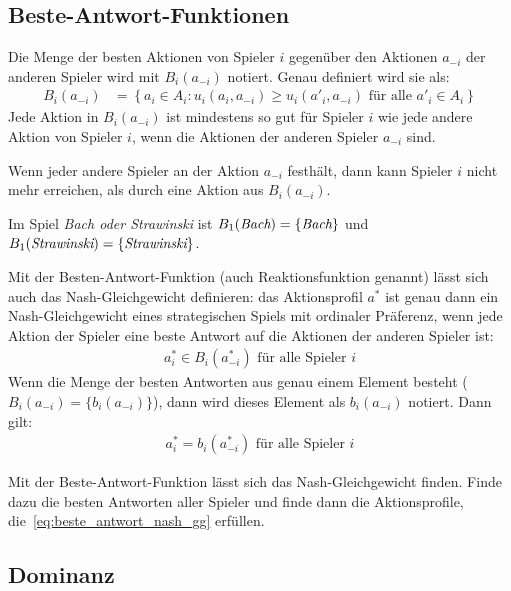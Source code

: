 \subsection{Beste-Antwort-Funktionen}%
\label{sub:beste_antwort_funktionen}

\begin{definition}
  Die Menge der besten Aktionen von Spieler $i$ gegenüber den Aktionen $a_{-i}$ der
  anderen Spieler wird mit $B_i(a_{-i})$ notiert.
  Genau definiert wird sie als:
  \begin{align*}
    B_i(a_{-i}) & = \left\{
      a_i \in A_i :
      u_i(a_i, a_{-i}) \geq u_i(a'_i, a_{-i})
      \text{ für alle $a'_i \in A_i$}
    \right\}
  \end{align*}
  Jede Aktion in $B_i(a_{-i})$ ist mindestens so gut für Spieler $i$ wie jede andere
  Aktion von Spieler $i$, wenn die Aktionen der anderen Spieler $a_{-i}$ sind.

  Wenn jeder andere Spieler an der Aktion $a_{-i}$ festhält, dann kann Spieler $i$ nicht
  mehr erreichen, als durch eine Aktion aus $B_i(a_{-i})$.
\end{definition}

Im Spiel \emph{Bach oder Strawinski} ist
$B_1(\emph{Bach}) = \{ \emph{Bach} \}$ und
$B_1(\emph{Strawinski}) = \{ \emph{Strawinski} \}$.

Mit der Besten-Antwort-Funktion (auch Reaktionsfunktion genannt) lässt sich auch das
Nash-Gleichgewicht definieren:
das Aktionsprofil $a^*$ ist genau dann ein Nash-Gleichgewicht eines strategischen Spiels
mit ordinaler Präferenz, wenn jede Aktion der Spieler eine beste Antwort auf die Aktionen
der anderen Spieler ist:
\begin{align}
  \label{eq:beste_antwort_nash_gg}
  a^*_i \in B_i(a^*_{-i}) \text{ für alle Spieler $i$}
\end{align}
Wenn die Menge der besten Antworten aus genau einem Element besteht
($B_i(a_{-i}) = \{ b_i(a_{-i}) \}$),
dann wird dieses Element als $b_i(a_{-i})$ notiert.
Dann gilt:
\begin{align*}
  a^*_i = b_i(a^*_{-i}) \text{ für alle Spieler $i$}
\end{align*}

Mit der Beste-Antwort-Funktion lässt sich das Nash-Gleichgewicht finden.
Finde dazu die besten Antworten aller Spieler und finde dann die Aktionsprofile,
die~\ref{eq:beste_antwort_nash_gg} erfüllen.

\subsection{Dominanz}%
\label{sub:dominanz}

